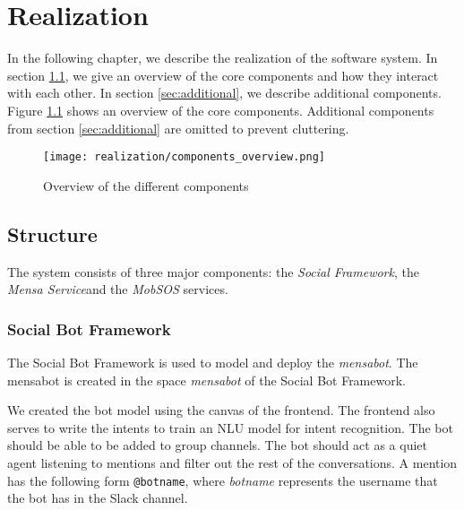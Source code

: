 \chapter{Realization}
In the following chapter, we describe the realization of the software system. In section \ref{sec:structure}, we give an overview of the core components and how they interact with each other. 
In section \ref{sec:additional}, we describe additional components. Figure \ref{fig:componentsOverview} shows an overview of the core components. Additional components from section \ref{sec:additional} are omitted to prevent cluttering.

\begin{figure}[h]
    \centering
    \texttt{[image: realization/components\_overview.png]}
    \caption{Overview of the different components}
    \label{fig:componentsOverview}
\end{figure}

\section{Structure}\label{sec:structure}
The system consists of three major components: the \emph{Social Framework}, the \emph{Mensa Service}\footnotemark and the \emph{MobSOS} services. 
\subsection{Social Bot Framework}
The Social Bot Framework is used to model and deploy the \emph{mensabot}. The mensabot is created in the space \emph{mensabot} of the Social Bot Framework.

We created the bot model using the canvas of the frontend. 
The frontend also serves to write the intents to train an NLU model for intent recognition. 
The bot should be able to be added to group channels. The bot should act as a quiet agent listening to mentions and filter out the rest of the conversations.
A mention has the following form \texttt{@botname}, where \emph{botname} represents the username that the bot has in the Slack channel.


